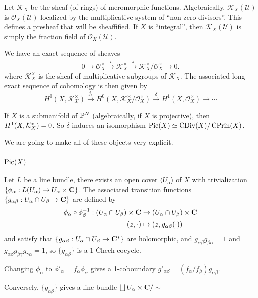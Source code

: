 Let $\mathcal{K}_X$ be the sheaf (of rings) of meromorphic functions. Algebraically, $\mathcal{K}_X(\mathcal{U})$ is $\mathcal{O}_X(\mathcal{U})$ localized by the multiplicative system of ``non-zero divisors''. This defines a presheaf that will be sheaffified. If $X$ is ``integral'', then $\mathcal{K}_X(\mathcal{U})$ is simply the fraction field of $\mathcal{O}_X(\mathcal{U})$.

We have an exact sequence of sheaves 
\[
0\to \mathcal{O}_X^\times \overset{i}{\to} \mathcal{K}_X^\times \overset{j}{\to} \mathcal{K}_X^\times/\mathcal{O}_X^\times \to 0.
\]
where $\mathcal{K}_X^\times$ is the sheaf of multiplicative subgroups of $\mathcal{K}_X$. The associated long exact sequence of cohomology is then given by 
\[
H^0(X,\mathcal{K_X^\times})\overset{j_*}{\to } H^0(X,\mathcal{K}_X^\times/\mathcal{O}_X^\times) \overset{\delta}{\to} H^1(X,\mathcal{O}_X^\times)\to \cdots
\]

If $X$ is a submanifold of ${\mathbb P}^{N}$ (algebraically, if $X$ is projective), then $H^1(X,\mathcal{K}^*_X) = 0$. So $\delta$ induces an isomorphism $\operatorname{Pic}(X) \simeq \operatorname{CDiv}(X)/\operatorname{CPrin}(X)$.

We are going to make all of these objects very explicit.

\subsubsection{$\operatorname{Pic}(X)$}
Let $L$ be a line bundle, there exists an open cover $\langle U_\alpha\rangle$ of $X$ with trivialization $\{\phi_\alpha : L(U_\alpha) \to U_\alpha \times \mathbf{C}\}$. The associated transition functions $\{g_{\alpha\beta} : U_\alpha \cap U_\beta \to \mathbf{C}\}$ are defined by
\begin{align*}
\phi_\alpha \circ \phi_\beta^{-1} : (U_\alpha \cap U_\beta) \times \mathbf{C} &\to  (U_\alpha \cap U_\beta) \times \mathbf{C}\\
(z,\cdot) &\mapsto (z,g_{\alpha\beta}(\cdot))
\end{align*}
and satisfy that $\{g_{\alpha\beta} : U_\alpha \cap U_\beta \to \mathbf{C}^*\}$ are holomorphic, and $g_{\alpha\beta}g_{\beta\alpha} = 1$ and $g_{\alpha\beta}g_{\beta\gamma}g_{\gamma\alpha} = 1$, so $\{g_{\alpha\beta}\}$ is a $1$-\v{C}hech-cocycle.

Changing $\phi_\alpha$ to $\phi'_\alpha = f_\alpha\phi_\alpha$ gives a 1-coboundary $g'_{\alpha\beta} = (f_\alpha/f_\beta)g_{\alpha\beta}$.


Conversely, $\{g_{\alpha\beta}\}$ gives a line bundle $\bigsqcup U_\alpha \times \mathbf{C}/\sim$



